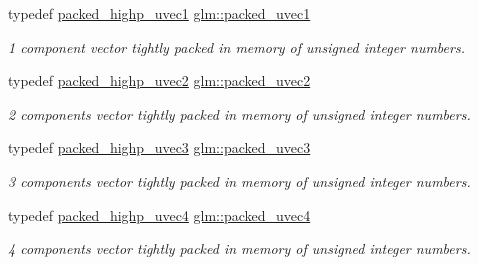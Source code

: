 \begin{DoxyCompactItemize}
typedef \hyperlink{group__gtc__type__aligned_ga160352f526bef94d143ccb525095936e}{packed\+\_\+highp\+\_\+uvec1} \hyperlink{group__gtc__type__aligned_gab4eb372e84e817a0d29128128394df01}{glm\+::packed\+\_\+uvec1}
\begin{DoxyCompactList}\small\item\em 1 component vector tightly packed in memory of unsigned integer numbers. \end{DoxyCompactList}\item 
\mbox{\label{group__gtc__type__aligned_gac05992fb0ced52150634ce1d8f95a8ad}} 
typedef \hyperlink{group__gtc__type__aligned_gafd17d664314ead069de290b1d5137c47}{packed\+\_\+highp\+\_\+uvec2} \hyperlink{group__gtc__type__aligned_gac05992fb0ced52150634ce1d8f95a8ad}{glm\+::packed\+\_\+uvec2}
\begin{DoxyCompactList}\small\item\em 2 components vector tightly packed in memory of unsigned integer numbers. \end{DoxyCompactList}\item 
\mbox{\label{group__gtc__type__aligned_ga4433b8f226dc66e91e99cb8079ddc7e3}} 
typedef \hyperlink{group__gtc__type__aligned_ga607425d3ca2ad292b115d09aef19e372}{packed\+\_\+highp\+\_\+uvec3} \hyperlink{group__gtc__type__aligned_ga4433b8f226dc66e91e99cb8079ddc7e3}{glm\+::packed\+\_\+uvec3}
\begin{DoxyCompactList}\small\item\em 3 components vector tightly packed in memory of unsigned integer numbers. \end{DoxyCompactList}\item 
\mbox{\label{group__gtc__type__aligned_ga32a9f8facf5745a6513186ce61122310}} 
typedef \hyperlink{group__gtc__type__aligned_ga769bab317264c023f8ee77897e4b5894}{packed\+\_\+highp\+\_\+uvec4} \hyperlink{group__gtc__type__aligned_ga32a9f8facf5745a6513186ce61122310}{glm\+::packed\+\_\+uvec4}
\begin{DoxyCompactList}\small\item\em 4 components vector tightly packed in memory of unsigned integer numbers. \end{DoxyCompactList}\item 
\mbox{\label{group__gtc__type__aligned_ga7db5fd015b60682f3fdfe9cab47188dd}} 

\end{DoxyCompactItemize}
